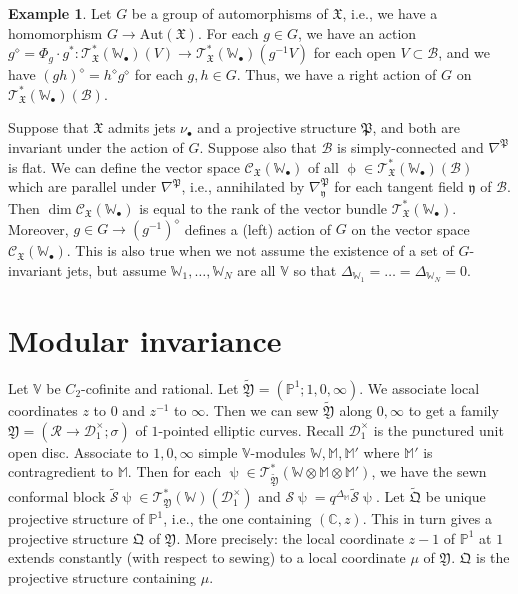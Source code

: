 \documentclass[12pt,b5paper,notitlepage]{report}
\theoremstyle{definition}
\newtheorem{eg}[df]{Example}
\theoremstyle{plain}
\newcommand{\fk}{\mathfrak}
\newcommand{\mc}{\mathcal}
\newcommand{\wtd}{\widetilde}
\newcommand{\scr}{\mathscr}
\newcommand{\yk}{\mathfrak y}
\newcommand{\mbb}{\mathbb}
\newcommand{\blt}{\bullet}
\newcommand{\Vbb}{\mathbb V}
\newcommand{\Wbb}{\mathbb W}
\newcommand{\Mbb}{\mathbb M}
\newcommand{\Cbb}{\mathbb C}
\newcommand{\Pbb}{\mathbb P}
\numberwithin{equation}{section}
\begin{document}
\begin{eg}\label{lb148}
Let $G$ be a group of automorphisms of $\fk X$, i.e., we have a homomorphism $G\rightarrow\mathrm{Aut}(\fk X)$. For each $g\in G$, we have an action $g^\diamond=\Phi_g\cdot g^*:\scr T_{\fk X}^*(\Wbb_\blt)(V)\rightarrow \scr T_{\fk X}^*(\Wbb_\blt)(g^{-1}V)$ for each open $V\subset\mc B$, and we have $(gh)^\diamond=h^\diamond g^\diamond$ for each $g,h\in G$. Thus, we have a right action of $G$ on $\scr T_{\fk X}^*(\Wbb_\blt)(\mc B)$.

Suppose that $\fk X$ admits jets $\nu_\blt$ and a projective structure $\fk P$, and both are invariant under the action of $G$. Suppose also that $\mc B$ is simply-connected and $\nabla^{\fk P}$ is flat. We can define the vector space  $\scr C_{\fk X}(\Wbb_\blt)$ of all $\upphi\in\scr T_{\fk X}^*(\Wbb_\blt)(\mc B)$ which are parallel under $\nabla^{\fk P}$, i.e., annihilated by $\nabla^{\fk P}_\yk$ for each tangent field $\yk$ of $\mc B$. Then $\dim\scr C_{\fk X}(\Wbb_\blt)$ is equal to the rank of the vector bundle $\scr T_{\fk X}^*(\Wbb_\blt)$. Moreover, $g\in G\rightarrow (g^{-1})^\diamond$ defines a (left) action of $G$ on  the vector space $\scr C_{\fk X}(\Wbb_\blt)$. This is also true when we not assume the existence of a set of $G$-invariant jets, but assume $\Wbb_1,\dots,\Wbb_N$ are all $\Vbb$ so that $\Delta_{\Wbb_1}=\dots=\Delta_{\Wbb_N}=0$.
\end{eg}







\section{Modular invariance}




Let $\Vbb$ be $C_2$-cofinite and rational. Let $\wtd{\fk Y}=(\Pbb^1;1,0,\infty)$. We associate local coordinates $z$ to $0$ and $z^{-1}$ to $\infty$. Then we can sew $\wtd{\fk Y}$ along $0,\infty$ to get a family $\fk Y=(\mc R\rightarrow\mc D_1^\times;\sigma)$ of $1$-pointed elliptic curves. Recall $\mc D_1^\times$ is the punctured unit open disc. Associate to $1,0,\infty$ simple $\Vbb$-modules $\Wbb,\Mbb,\Mbb'$ where $\Mbb'$ is contragredient to $\Mbb$. Then for each $\uppsi\in\scr T_{\wtd{\fk Y}}^*(\Wbb\otimes\Mbb\otimes\Mbb')$, we have the sewn conformal block $\wtd{\mc S}\uppsi\in \scr T_{\fk Y}^*(\Wbb)(\mc D_1^\times)$ and $\mc S\uppsi=q^{\Delta_\Mbb}\wtd{\mc S}\uppsi$. Let $\wtd{\fk Q}$ be unique projective structure of $\Pbb^1$, i.e., the one containing $(\Cbb,z)$. This in turn gives a projective structure $\fk Q$ of $\fk Y$. More precisely: the local coordinate $z-1$ of $\mbb P^1$ at $1$ extends constantly (with respect to sewing) to a local coordinate $\mu$ of $\fk Y$. $\fk Q$ is the projective structure containing $\mu$. 
\end{document}
